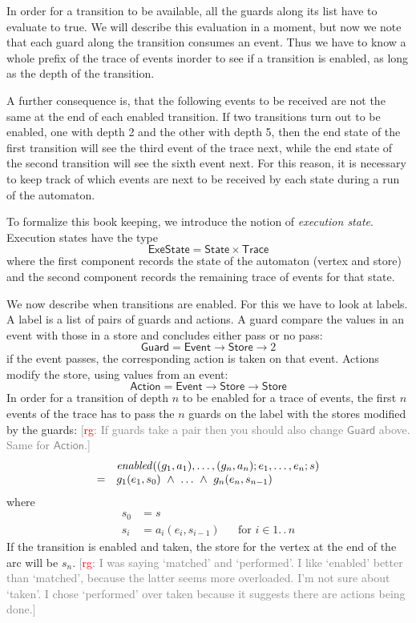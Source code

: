 \documentclass[preprint]{sigplanconf} %
\newcommand{\note}[2]{\textcolor{gray}{[\textcolor{red}{#1}: #2]}}
\newcommand{\rg}[1]{\note{rg}{#1}}
\newcommand{\set}[1]{\ensuremath{\mathsf{#1}}}
\theoremstyle{definition}
\theoremstyle{remark}
\begin{document}
In order for a transition to be available, all the guards along its
list have to evaluate to true. We will describe this evaluation in a
moment, but now we note that each guard along the transition consumes
an event. Thus we have to know a whole prefix of the trace of events
inorder to see if a transition is enabled, as long as the depth of the
transition.

A further consequence is, that the following events to be received are
not the same at the end of each enabled transition. If two transitions
turn out to be enabled, one with depth 2 and the other with depth 5,
then the end state of the first transition will see the third event of
the trace next, while the end state of the second transition will see
the sixth event next. For this reason, it is necessary to keep track
of which events are next to be received by each state during a run of
the automaton.

To formalize this book keeping, we introduce the notion of
\emph{execution state}. Execution states have the type
\[
\set{ExeState} = \set{State}\times\set{Trace}
\]
where the first component records the state of the automaton (vertex
and store) and the second component records the remaining trace of
events for that state.

We now describe when transitions are enabled. For this we have to look
at labels. A label is a list of pairs of guards and actions. A
guard compare the values in an event with those in a store and
concludes either pass or no pass:
\[
\set{Guard} = \set{Event}\to\set{Store}\to2
\]
if the event passes, the corresponding action is taken on that event.
Actions modify the store, using values from an event:
\[
\set{Action} = \set{Event}\to\set{Store}\to\set{Store}
\]
In order for a transition of depth $n$ to be enabled for a trace of
events, the first $n$ events of the trace has to pass the $n$ guards
on the label with the stores modified by the guards:
\rg{If guards take a pair then you should also change \set{Guard} above.
Same for \set{Action}.}
\[
\begin{array}{c l}
& \mathit{enabled}((g_1, a_1), \ldots, (g_n, a_n); e_1, \ldots, e_n; s) \\
 = &
g_1(e_1, s_0)\ \land\ \ldots\ \land\ g_n(e_n, s_{n-1}) 
\end{array}
\]
where
\begin{align}
  s_0 &=  s \\
  s_i &= a_i(e_i, s_{i-1}) &&\text{for $i\in1.\,.\,n$}
\end{align}
If the transition is enabled and taken, the store for the vertex at the end of the arc will be $s_n$.
\rg{I was saying `matched' and `performed'.
I like `enabled' better than `matched', because the latter seems more overloaded.
I'm not sure about `taken'.
I chose `performed' over taken because it suggests there are actions being done.}
\end{document}
